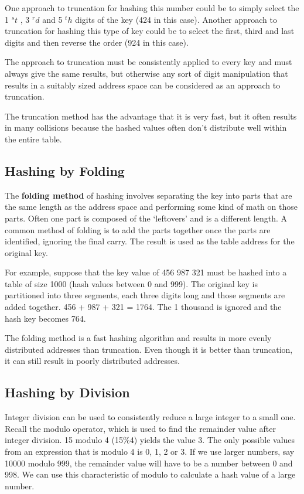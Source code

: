      One approach to truncation for hashing this number could be to simply select the 1 $^st$ , 3 $^rd$ and 5 $^th$ digits of the key (424 in this case). Another approach to truncation for hashing this type of key could be to select the first, third and last digits and then reverse the order (924 in this case).
     
The approach to truncation must be consistently applied to every key and must always give the same results, but otherwise any sort of digit manipulation that results in a suitably sized address space can be considered as an approach to truncation.

The truncation method has the advantage that it is very fast, but it often results in many collisions because the hashed values often don’t distribute well within the entire table.

\subsection{Hashing by Folding}

The \textbf{folding method} of hashing involves separating the key into parts that are the same length as the address space and performing some kind of math on those parts.  Often one part is composed of the ‘leftovers’ and is a different length.  A common method of folding is to add the parts together once the parts are identified, ignoring the final carry.   The result is used as the table address for the original key.


For example, suppose that the key value of 456 987 321 must be hashed into a table of size 1000 (hash values between 0 and 999). The original key is partitioned into three segments, each three digits long and those segments are added together. 456 + 987 + 321 = 1764. The 1 thousand is ignored and the hash key becomes 764.

The folding method is a fast hashing algorithm and results in more evenly distributed addresses than truncation.  Even though it is better than truncation, it can still result in poorly distributed addresses.

\subsection{Hashing by Division}

Integer division can be used to consistently reduce a large integer to a small one.  Recall the modulo operator, which is used to find the remainder value after integer division.   15 modulo 4 (15\%4) yields the value 3.    The only possible values from an expression that is modulo 4 is 0, 1, 2 or 3.    If we use larger numbers,  say 10000 modulo 999,  the remainder value will have to be  a number between 0 and 998.  We can use this characteristic of  modulo to calculate a hash value of a large number.

